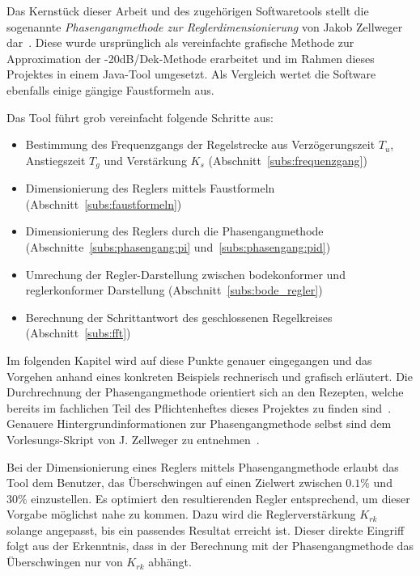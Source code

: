 Das  Kernst\"uck  dieser Arbeit  und  des  zugeh\"origen Softwaretools  stellt
die   sogenannte   \emph{Phasengangmethode  zur   Reglerdimensionierung}   von
Jakob   Zellweger   dar~\cite{regelungstechnik:zellweger_short}. Diese   wurde
urspr\"unglich  als  vereinfachte  grafische  Methode  zur  Approximation  der
-20dB/Dek-Methode erarbeitet und im Rahmen dieses Projektes in einem Java-Tool
umgesetzt. Als  Vergleich  wertet  die  Software  ebenfalls  einige  g\"angige
Faustformeln aus.

Das Tool f\"uhrt grob vereinfacht folgende Schritte aus:
\begin{itemize}
    \item
        Bestimmung des  Frequenzgangs der Regelstrecke  aus Verz\"ogerungszeit
        $T_u$,     Anstiegszeit     $T_g$      und     Verst\"arkung     $K_s$
        (Abschnitt~\ref{subs:frequenzgang})
    \item
        Dimensionierung       des      Reglers       mittels      Faustformeln
        (Abschnitt~\ref{subs:faustformeln})
    \item
        Dimensionierung    des    Reglers    durch    die    Phasengangmethode
        (Abschnitte~\ref{subs:phasengang:pi} und~\ref{subs:phasengang:pid})
    \item
        Umrechung   der   Regler-Darstellung    zwischen   bodekonformer   und
        reglerkonformer Darstellung (Abschnitt~\ref{subs:bode_regler})
    \item
        Berechnung   der   Schrittantwort   des   geschlossenen   Regelkreises
        (Abschnitt~\ref{subs:fft})
\end{itemize}

Im   folgenden   Kapitel   wird   auf   diese   Punkte   genauer   eingegangen
und   das    Vorgehen   anhand    eines   konkreten    Beispiels   rechnerisch
und    grafisch   erl\"autert. Die    Durchrechnung   der    Phasengangmethode
orientiert     sich     an     den     Rezepten,     welche     bereits     im
fachlichen     Teil     des     Pflichtenheftes    dieses     Projektes     zu
finden  sind~\cite{ref:pflichtenheft}. Genauere  Hintergrundinformationen  zur
Phasengangmethode  selbst  sind  dem  Vorlesungs-Skript  von  J. Zellweger  zu
entnehmen~\cite{regelungstechnik:zellweger_short}.

Bei der  Dimensionierung eines  Reglers mittels Phasengangmethode  erlaubt das
Tool dem Benutzer, das \"Uberschwingen auf einen Zielwert zwischen $0.1\%$ und
$30\%$ einzustellen. Es  optimiert den resultierenden Regler  entsprechend, um
dieser Vorgabe  m\"oglichst nahe zu kommen. Dazu  wird die Reglerverst\"arkung
$K_{rk}$ solange  angepasst, bis  ein passendes Resultat  erreicht ist. Dieser
direkte Eingriff  folgt aus  der Erkenntnis,  dass in  der Berechnung  mit der
Phasengangmethode das \"Uberschwingen nur von $K_{rk}$ abh\"angt.

